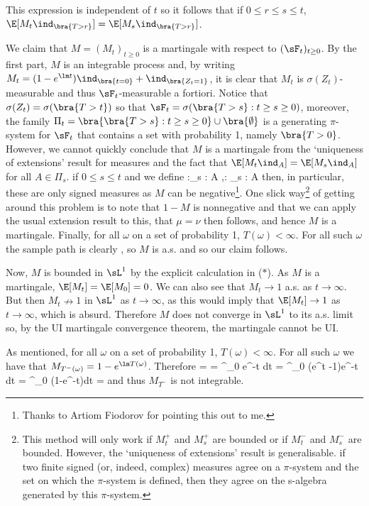 This expression is independent of $t$ so it follows that if $0\leq r\leq s\leq t$, $\E[M_t\ind_{\bra{T>r}}]=\E[M_s\ind_{\bra{T>r}}]$.

We claim that $M = (M_t)_{t\geq 0}$ is a \cadlag martingale with respect to $(\sF_t)_{t\geq 0}$. By the first part, $M$ is an integrable process and, by writing $M_t = (1-e^{\lm t} )\ind_{\bra{t=0}} + \ind_{\bra{Z_t=1}}$, it is clear that $M_t$ is $\sigma(Z_t)$-measurable and thus $\sF_t$-measurable a fortiori. Notice that $\sigma(Z_t) = \sigma(\bra{T > t})$ so that $\sF_t = \sigma(\bra{T > s}: t \geq  s \geq  0)$, moreover, the family $\Pi_t = \bra{\bra{T > s}: t \geq  s \geq  0} \cup \bra{\emptyset}$ is a generating $\pi$-system for $\sF_t$ that contains a set with probability 1, namely $\bra{T > 0}$. However, we cannot quickly conclude that $M$ is a martingale from the `uniqueness of extensions' result for measures and the fact that $\E[M_t\ind_A] = \E[M_s\ind_A]$ for all $A \in \Pi_s$. if $0 \leq  s \leq t$ and we define
\be
\mu:\sF_s \to [-\infty,\infty] : A \mapsto \E[M_s\ind_A],\qquad \nu: \sF_s \to [-\infty,\infty] : A \mapsto \E[M_t\ind_A]
\ee
then, in particular, these are only signed measures as $M$ can be negative\footnote{Thanks to Artiom Fiodorov for pointing this out to me.}. One slick way\footnote{This method will only work if $M^+_t$ and $M^+_s$ are bounded or if $M^-_t$ and $M^-_s$ are bounded. However, the `uniqueness of extensions' result is generalisable. if two finite signed (or, indeed, complex) measures agree on a $\pi$-system and the set on which the $\pi$-system is defined, then they agree on the s-algebra generated by this $\pi$-system. } of getting around this problem is to note that $1-M$ is nonnegative and that we can apply the usual extension result to this, that $\mu = \nu$ then follows, and hence $M$ is a martingale. Finally, for all $\omega$ on a set of probability 1, $T(\omega) < \infty$. For all such $\omega$ the sample path is clearly \cadlag, so $M$ is a.s. \cadlag and so our claim follows.

Now, $M$ is bounded in $\sL^1$ by the explicit calculation in ($*$). As $M$ is a martingale, $\E[M_t ] =\E[M_0] = 0$. We can also see that $M_t\to 1$ a.s. as $t \to \infty$. But then $M_t \nrightarrow 1$ in $\sL^1$ as $t \to \infty$, as this would imply that $\E[M_t ]\to 1$ as $t \to \infty$, which is absurd. Therefore $M$ does not converge in $\sL^1$ to its a.s. limit so, by the UI martingale convergence theorem, the martingale cannot be UI.

As mentioned, for all $\omega$ on a set of probability 1, $T(\omega) < \infty$. For all such $\omega$ we have that $M_{T^-(\omega)} = 1-e^{\lm T(\omega)}$. Therefore
\be
\E{} = \E{} = \int^\infty_0  e^{-\lm t} dt = \int^\infty_0 (e^{\lm t} -1)\lm e^{-\lm t} dt = \int^\infty_0 \lm(1-e^{-\lm t})dt = \infty
\ee
and thus $M_{T^-}$ is not integrable.

